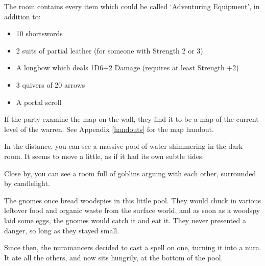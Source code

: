 \begin{multicols}{2}
\begin{boxtext}
\end{boxtext}

The room contains every item which could be called `Adventuring Equipment',
\iftoggle{core}{%
\footnote{See the core book, page \pageref{start_equipment}.}
}{}%
in addition to:

\begin{itemize}

	\item{10 shortswords}
	\item{2 suits of partial leather (for someone with Strength 2 or 3)}
	\iftoggle{hardcore}{%
	\item{1 suit of partial leather (for someone with Strength 1 or 2)}
	}{
	\item{2 suits of partial chain (for someone with Strength 1 or 2)}
	}
	\item{A longbow which deals 1D6+2 Damage (requires at least Strength +2)}
	\item{3 quivers of 20 arrows}
	\item{A portal scroll}

\end{itemize}

If the party examine the map on the wall, they find it to be a map of the current level of the warren.
See Appendix \ref{handouts} for the map handout.


\begin{boxtext}

	In the distance, you can see a massive pool of water shimmering in the dark room.
	It seems to move a little, as if it had its own subtle tides.

	Close by, you can see a room full of goblins arguing with each other, surrounded by candlelight.

\end{boxtext}

\begin{exampletext}

	The gnomes once bread woodspies in this little pool.
	They would chuck in various leftover food and organic waste from the surface world, and as soon as a woodspy laid some eggs, the gnomes would catch it and eat it.
	They never presented a danger, so long as they stayed small.

	Since then, the nuramancers decided to cast a spell on one, turning it into a nura.
	It ate all the others, and now sits hungrily, at the bottom of the pool.


\end{exampletext}
\end{multicols}
